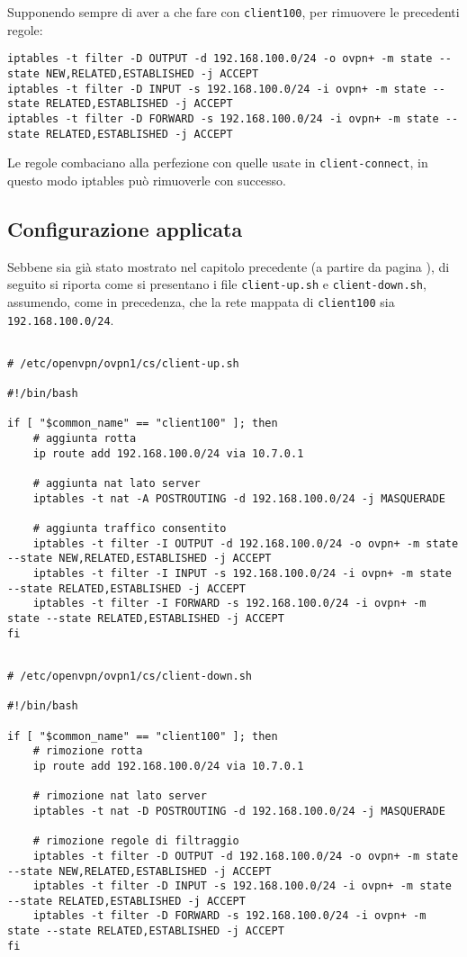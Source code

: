 		Supponendo sempre di aver a che fare con \texttt{client100}, per rimuovere le precedenti regole:
\begin{verbatim}
iptables -t filter -D OUTPUT -d 192.168.100.0/24 -o ovpn+ -m state --state NEW,RELATED,ESTABLISHED -j ACCEPT
iptables -t filter -D INPUT -s 192.168.100.0/24 -i ovpn+ -m state --state RELATED,ESTABLISHED -j ACCEPT
iptables -t filter -D FORWARD -s 192.168.100.0/24 -i ovpn+ -m state --state RELATED,ESTABLISHED -j ACCEPT   
\end{verbatim}
		Le regole combaciano alla perfezione con quelle usate in \texttt{client-connect}, in questo modo
        iptables può rimuoverle con successo.
        

    \subsection{Configurazione applicata}
    Sebbene sia già stato mostrato nel capitolo precedente (a partire da pagina \pageref{sec:ending}),
    di seguito si riporta come si presentano i file \texttt{client-up.sh} e \texttt{client-down.sh},
    assumendo, come in precedenza, che la rete mappata di \texttt{client100} sia \texttt{192.168.100.0/24}.

\begin{verbatim}

# /etc/openvpn/ovpn1/cs/client-up.sh

#!/bin/bash
                
if [ "$common_name" == "client100" ]; then
	# aggiunta rotta
	ip route add 192.168.100.0/24 via 10.7.0.1

	# aggiunta nat lato server
	iptables -t nat -A POSTROUTING -d 192.168.100.0/24 -j MASQUERADE
        
	# aggiunta traffico consentito
	iptables -t filter -I OUTPUT -d 192.168.100.0/24 -o ovpn+ -m state --state NEW,RELATED,ESTABLISHED -j ACCEPT
	iptables -t filter -I INPUT -s 192.168.100.0/24 -i ovpn+ -m state --state RELATED,ESTABLISHED -j ACCEPT
	iptables -t filter -I FORWARD -s 192.168.100.0/24 -i ovpn+ -m state --state RELATED,ESTABLISHED -j ACCEPT
fi
\end{verbatim}
        
\begin{verbatim}

# /etc/openvpn/ovpn1/cs/client-down.sh
        
#!/bin/bash
             
if [ "$common_name" == "client100" ]; then
	# rimozione rotta
	ip route add 192.168.100.0/24 via 10.7.0.1

	# rimozione nat lato server
	iptables -t nat -D POSTROUTING -d 192.168.100.0/24 -j MASQUERADE
        
	# rimozione regole di filtraggio
	iptables -t filter -D OUTPUT -d 192.168.100.0/24 -o ovpn+ -m state --state NEW,RELATED,ESTABLISHED -j ACCEPT
	iptables -t filter -D INPUT -s 192.168.100.0/24 -i ovpn+ -m state --state RELATED,ESTABLISHED -j ACCEPT
	iptables -t filter -D FORWARD -s 192.168.100.0/24 -i ovpn+ -m state --state RELATED,ESTABLISHED -j ACCEPT
fi
\end{verbatim}

